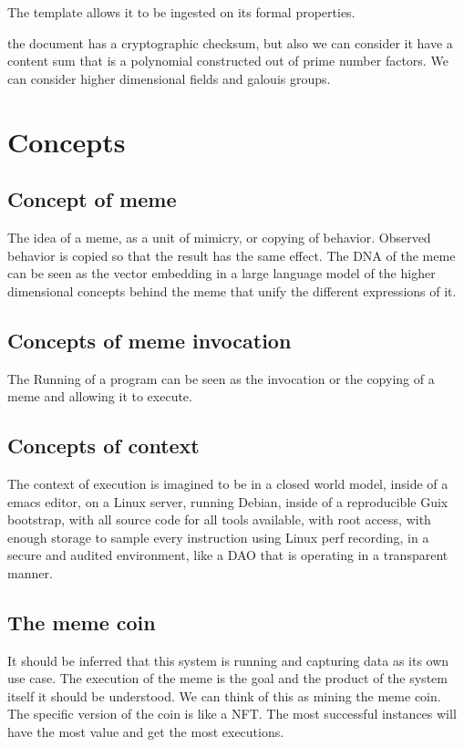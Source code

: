 \documentclass{article}
\begin{document}
The template allows it to be ingested on its formal properties.

the document has a cryptographic checksum, but also we can consider it have a content sum that is a polynomial
constructed out of prime number factors.
We can consider higher dimensional fields and galouis groups.

\section{Concepts}
\label{sec:concepts}

\subsection{Concept of meme}
The idea of a meme, as a unit of mimicry, or copying of behavior.
Observed behavior is copied so that the result has the same effect.
The DNA of the meme can be seen as the vector embedding in a large language model
of the higher dimensional concepts behind the meme that unify the different expressions of it.

\subsection{Concepts of meme invocation}

The Running of a program can be seen as the invocation or the copying of a meme
and allowing it to execute.

\subsection{Concepts of context}

The context of execution is imagined to be in a closed world model,
inside of a emacs editor, on a Linux server, running Debian,
inside of a reproducible Guix bootstrap,
with all source code for all tools available,
with root access,
with enough storage to sample every instruction using Linux perf recording,
in a secure and audited environment, like a DAO that is operating in a transparent manner.

\subsection{The meme coin}

It should be inferred that this system is
running and capturing data as its own use case. The execution of the meme is the goal and the product of the system itself it should be understood. We can think of this as mining the meme coin. The specific version of the coin is like a NFT. The most successful instances will have the most value and get the most executions. 
\end{document}
